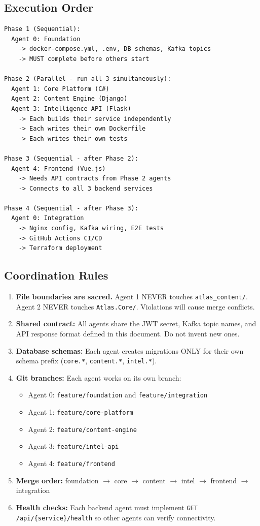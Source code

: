 \documentclass[12pt,letterpaper]{article}
\begin{document}
\subsection{Execution Order}

\begin{lstlisting}[style=code]
Phase 1 (Sequential):
  Agent 0: Foundation
    -> docker-compose.yml, .env, DB schemas, Kafka topics
    -> MUST complete before others start

Phase 2 (Parallel - run all 3 simultaneously):
  Agent 1: Core Platform (C#)
  Agent 2: Content Engine (Django)
  Agent 3: Intelligence API (Flask)
    -> Each builds their service independently
    -> Each writes their own Dockerfile
    -> Each writes their own tests

Phase 3 (Sequential - after Phase 2):
  Agent 4: Frontend (Vue.js)
    -> Needs API contracts from Phase 2 agents
    -> Connects to all 3 backend services

Phase 4 (Sequential - after Phase 3):
  Agent 0: Integration
    -> Nginx config, Kafka wiring, E2E tests
    -> GitHub Actions CI/CD
    -> Terraform deployment
\end{lstlisting}

\subsection{Coordination Rules}
\begin{enumerate}
  \item \textbf{File boundaries are sacred.} Agent 1 NEVER touches \texttt{atlas\_content/}. Agent 2 NEVER touches \texttt{Atlas.Core/}. Violations will cause merge conflicts.
  \item \textbf{Shared contract:} All agents share the JWT secret, Kafka topic names, and API response format defined in this document. Do not invent new ones.
  \item \textbf{Database schemas:} Each agent creates migrations ONLY for their own schema prefix (\texttt{core.*}, \texttt{content.*}, \texttt{intel.*}).
  \item \textbf{Git branches:} Each agent works on its own branch:
  \begin{itemize}
    \item Agent 0: \texttt{feature/foundation} and \texttt{feature/integration}
    \item Agent 1: \texttt{feature/core-platform}
    \item Agent 2: \texttt{feature/content-engine}
    \item Agent 3: \texttt{feature/intel-api}
    \item Agent 4: \texttt{feature/frontend}
  \end{itemize}
  \item \textbf{Merge order:} foundation $\rightarrow$ core $\rightarrow$ content $\rightarrow$ intel $\rightarrow$ frontend $\rightarrow$ integration
  \item \textbf{Health checks:} Each backend agent must implement \texttt{GET /api/\{service\}/health} so other agents can verify connectivity.
\end{enumerate}
\end{document}
